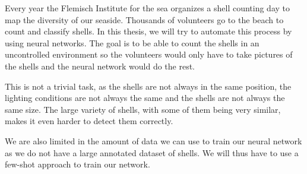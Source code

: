 Every year the Flemisch Institute for the sea organizes a shell counting day to map the diversity of our seaside. 
Thousands of volunteers go to the beach to count and classify shells. 
In this thesis, we will try to automate this process by using neural networks.
The goal is to be able to count the shells in an uncontrolled environment so the volunteers would only have to take pictures of the shells and the neural network would do the rest.

This is not a trivial task, as the shells are not always in the same position, the lighting conditions are not always the same and the shells are not always the same size.
The large variety of shells, with some of them being very similar, makes it even harder to detect them correctly.

We are also limited in the amount of data we can use to train our neural network as we do not have a large annotated dataset of shells. We will thus have to use a few-shot approach to train our network.